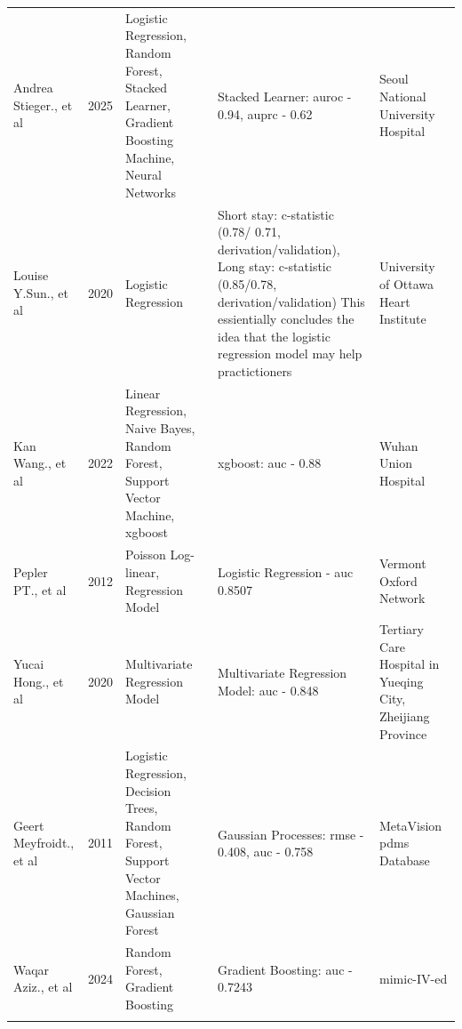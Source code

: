 \documentclass[11pt]{article}
\begin{document}
{{\begin{center}
\begin{longtable}{ |L{2cm} | L{1cm} | L{4cm} | 
 L{6cm} | L{2cm} |}
 Andrea Stieger., et al \cite{Stieger2025}  & 2025 & Logistic Regression, Random Forest, Stacked Learner, Gradient Boosting Machine, Neural Networks & Stacked Learner: \gls{auroc} - 0.94, \gls{auprc} - 0.62 &
 Seoul National University Hospital\\ 
    \noalign{\global\setlength{\arrayrulewidth}{0.05mm}}
    \hline
    \noalign{\global\setlength{\arrayrulewidth}{0.7mm}}
 Louise Y.Sun., et al \cite{Sun2020}  & 2020 & Logistic Regression & Short stay: c-statistic (0.78/ 0.71, derivation/validation), Long stay: c-statistic (0.85/0.78, derivation/validation) This essientially concludes the idea that the logistic regression model may help practictioners &
 University of Ottawa Heart Institute\\ 
    \noalign{\global\setlength{\arrayrulewidth}{0.05mm}}
    \hline
    \noalign{\global\setlength{\arrayrulewidth}{0.7mm}}
 Kan Wang., et al \cite{Zhang2022} & 2022 & Linear Regression, Naive Bayes, Random Forest, Support Vector Machine, \gls{xgboost} & \gls{xgboost}: \gls{auc} - 0.88 &
 Wuhan Union Hospital\\ 
    \noalign{\global\setlength{\arrayrulewidth}{0.05mm}}
    \hline
    \noalign{\global\setlength{\arrayrulewidth}{0.7mm}}
 Pepler PT., et al \cite{Pepler2012}  & 2012 & Poisson Log-linear, Regression Model & Logistic Regression - \gls{auc} 0.8507 &
 Vermont Oxford Network\\ 
    \noalign{\global\setlength{\arrayrulewidth}{0.05mm}}
    \hline
    \noalign{\global\setlength{\arrayrulewidth}{0.7mm}}
 Yucai Hong., et al \cite{Hong2020}  & 2020 & Multivariate Regression Model & Multivariate Regression Model: \gls{auc} - 0.848 &
Tertiary Care Hospital in Yueqing City, Zheijiang Province\\ 
    \noalign{\global\setlength{\arrayrulewidth}{0.05mm}}
    \hline
    \noalign{\global\setlength{\arrayrulewidth}{0.7mm}}
 Geert Meyfroidt., et al \cite{Meyfroidt2011} & 2011 & Logistic Regression, Decision Trees, Random Forest, Support Vector Machines, Gaussian Forest & Gaussian Processes: \gls{rmse} - 0.408, \gls{auc} - 0.758 &
 MetaVision \gls{pdms} Database\\ 
    \noalign{\global\setlength{\arrayrulewidth}{0.05mm}}
    \hline
    \noalign{\global\setlength{\arrayrulewidth}{0.7mm}}
 Waqar Aziz., et al \cite{Aziz2024} & 2024 & Random Forest, Gradient Boosting & Gradient Boosting: \gls{auc} - 0.7243 &
 \gls{mimic}-IV-\gls{ed}\\ 
    \noalign{\global\setlength{\arrayrulewidth}{0.05mm}}
    \hline
 \noalign{\global\setlength{\arrayrulewidth}{0.7mm}}

\end{longtable}
\end{center}}}
\end{document}
